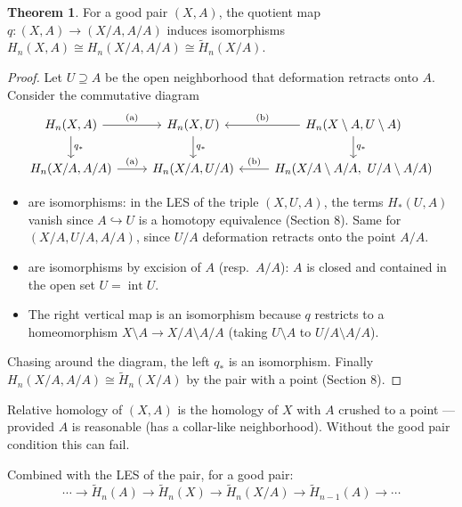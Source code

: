 \documentclass[11pt]{article}
\newcommand{\Hred}{\tilde H}
\theoremstyle{definition}
\newtheorem{thm}{Theorem}[section]
\begin{document}
\begin{thm}
For a good pair $(X,A)$, the quotient map $q:(X,A)\to(X/A,A/A)$ induces isomorphisms $H_n(X,A)\cong H_n(X/A,A/A)\cong\Hred_n(X/A)$.
\end{thm}
\begin{proof}
Let $U\supseteq A$ be the open neighborhood that deformation retracts onto $A$. Consider the commutative diagram
\[\begin{tikzcd}
H_n(X,A)\ar[r,"\text{(a)}"]\ar[d,"q_*"] & H_n(X,U)\ar[d,"q_*"] & H_n(X\setminus A,U\setminus A)\ar[l,"\text{(b)}"']\ar[d,"q_*"]\\
H_n(X/A,A/A)\ar[r,"\text{(a)}"] & H_n(X/A,U/A) & H_n(X/A\setminus A/A,\ U/A\setminus A/A)\ar[l,"\text{(b)}"']
\end{tikzcd}\]
\begin{itemize}
\item[(a)] are isomorphisms: in the LES of the triple $(X,U,A)$, the terms $H_*(U,A)$ vanish since $A\hookrightarrow U$ is a homotopy equivalence (Section 8). Same for $(X/A,U/A,A/A)$, since $U/A$ deformation retracts onto the point $A/A$.
\item[(b)] are isomorphisms by excision of $A$ (resp.\ $A/A$): $A$ is closed and contained in the open set $U=\operatorname{int}U$.
\item The right vertical map is an isomorphism because $q$ restricts to a homeomorphism $X\setminus A\to X/A\setminus A/A$ (taking $U\setminus A$ to $U/A\setminus A/A$).
\end{itemize}
Chasing around the diagram, the left $q_*$ is an isomorphism. Finally $H_n(X/A,A/A)\cong\Hred_n(X/A)$ by the pair with a point (Section 8).
\end{proof}
\begin{intuition}
Relative homology of $(X,A)$ is the homology of $X$ with $A$ crushed to a point --- provided $A$ is reasonable (has a collar-like neighborhood). Without the good pair condition this can fail.
\end{intuition}
Combined with the LES of the pair, for a good pair:
\[\cdots\to\Hred_n(A)\to\Hred_n(X)\to\Hred_n(X/A)\to\Hred_{n-1}(A)\to\cdots\]
\end{document}
